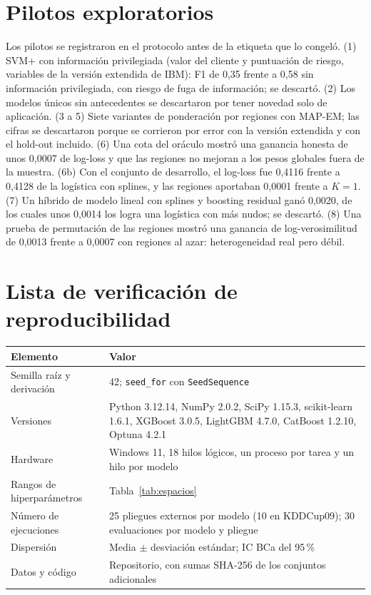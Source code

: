 \documentclass[11pt,a4paper]{article}
\begin{document}
\section{Pilotos exploratorios}
Los pilotos se registraron en el protocolo antes de la etiqueta que lo congeló. (1) SVM+ con información privilegiada (valor del cliente y puntuación de riesgo, variables de la versión extendida de IBM): F1 de 0,35 frente a 0,58 sin información privilegiada, con riesgo de fuga de información; se descartó. (2) Los modelos únicos sin antecedentes se descartaron por tener novedad solo de aplicación. (3 a 5) Siete variantes de ponderación por regiones con MAP-EM; las cifras se descartaron porque se corrieron por error con la versión extendida y con el hold-out incluido. (6) Una cota del oráculo mostró una ganancia honesta de unos 0,0007 de log-loss y que las regiones no mejoran a los pesos globales fuera de la muestra. (6b) Con el conjunto de desarrollo, el log-loss fue 0,4116 frente a 0,4128 de la logística con splines, y las regiones aportaban 0,0001 frente a $K=1$. (7) Un híbrido de modelo lineal con splines y boosting residual ganó 0,0020, de los cuales unos 0,0014 los logra una logística con más nudos; se descartó. (8) Una prueba de permutación de las regiones mostró una ganancia de log-verosimilitud de 0,0013 frente a 0,0007 con regiones al azar: heterogeneidad real pero débil.

\section{Lista de verificación de reproducibilidad}\label{app:repro}
\begin{table}[H]
\centering
\small
\begin{tabular}{p{4.3cm}p{10cm}}
\toprule
Elemento & Valor \\
\midrule
Semilla raíz y derivación & 42; \texttt{seed\_for} con \texttt{SeedSequence} \\
Versiones & Python 3.12.14, NumPy 2.0.2, SciPy 1.15.3, scikit-learn 1.6.1, XGBoost 3.0.5, LightGBM 4.7.0, CatBoost 1.2.10, Optuna 4.2.1 \\
Hardware & Windows 11, 18 hilos lógicos, un proceso por tarea y un hilo por modelo \\
Rangos de hiperparámetros & Tabla~\ref{tab:espacios} \\
Número de ejecuciones & 25 pliegues externos por modelo (10 en KDDCup09); 30 evaluaciones por modelo y pliegue \\
Dispersión & Media $\pm$ desviación estándar; IC BCa del 95\,\% \\
Datos y código & Repositorio, con sumas SHA-256 de los conjuntos adicionales \\
\bottomrule
\end{tabular}
\end{table}
\end{document}
